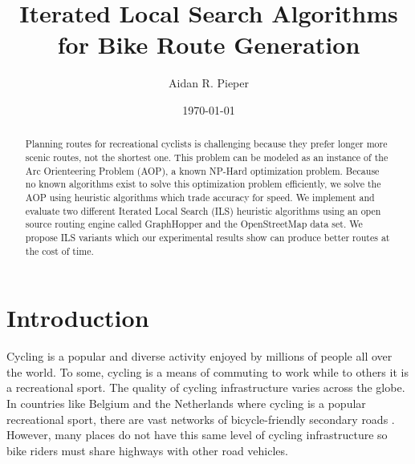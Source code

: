 \documentclass[honors]{union-cs-thesis}
\begin{document}



\title{Iterated Local Search Algorithms for Bike Route Generation}
\author{Aidan R. Pieper}
\date{\today}


\maketitle

\begin{abstract}
\makeabstract

Planning routes for recreational cyclists is challenging because they prefer longer more scenic routes, not the shortest one. This problem can be modeled as an instance of the Arc Orienteering Problem (AOP), a known NP-Hard optimization problem. Because no known algorithms exist to solve this optimization problem efficiently, we solve the AOP using  heuristic algorithms which trade accuracy for speed. We implement and evaluate two different Iterated Local Search (ILS) heuristic algorithms using an open source routing engine called GraphHopper and the OpenStreetMap data set. We propose ILS variants which our experimental results show can produce better routes at the cost of time. 

\end{abstract}

\tableofcontents
\listoffigures %
\listoftables %
\lstlistoflistings
\makepreamble


\section{Introduction}
Cycling is a popular and diverse activity enjoyed by millions of people all over the world. To some, cycling is a means of commuting to work while to others it is a recreational sport.  The quality of cycling infrastructure varies across the globe. In countries like Belgium and the Netherlands where cycling is a popular recreational sport, there are vast networks of bicycle-friendly secondary roads \cite{souffriau2011planning}. However, many places do not have this same level of cycling infrastructure so bike riders must share highways with other road vehicles.
\end{document}
